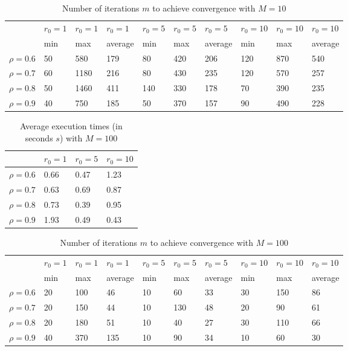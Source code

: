 \documentclass[a4paper,11pt,openright]{report}
\begin{document}
\begin{table}[H]
\centering
\addtolength{\leftskip}{-1.5cm}
\addtolength{\rightskip}{-1.5cm}
\begin{tabular}{|c|lllllllll|}
\hline
$ $ & $r_0 = 1$ & $r_0 = 1$ & $r_0 = 1$ & $r_0 = 5$ & $r_0 = 5$ & $r_0 = 5$ & $r_0 = 10$ & $r_0 = 10$ & $r_0 = 10$  \\
$ $ & min & max & average & min & max & average & min & max & average \\ 
\hline
$\rho = 0.6$ & 50 & 580 & 179 & 80 & 420 & 206 & 120 & 870 & 540 \\

$\rho = 0.7$ & 60 & 1180 & 216 & 80 & 430 & 235 & 120 & 570 & 257\\

$\rho = 0.8$ & 50 & 1460 & 411 & 140 & 330 & 178 & 70 & 390 & 235\\

$\rho = 0.9$ & 40 & 750 & 185 & 50 & 370 & 157 & 90 & 490 & 228\\
\hline
\end{tabular}
\caption{Number of iterations $m$ to achieve convergence with $M = 10$}
\end{table}
\begin{table}[H]
\centering
\addtolength{\leftskip}{-1.5cm}
\addtolength{\rightskip}{-1.5cm}
\begin{tabular}{|c|lll|}
\hline
$ $ & $r_0 = 1$ & $r_0 = 5$ & $r_0 = 10$ \\
\hline
$\rho = 0.6$ & 0.66 & 0.47 & 1.23 \\

$\rho = 0.7$ & 0.63 & 0.69 & 0.87 \\

$\rho = 0.8$ & 0.73 & 0.39 & 0.95 \\

$\rho = 0.9$ & 1.93 & 0.49 & 0.43 \\
\hline
\end{tabular}
\caption{Average execution
 times (in seconds $s$) with $M = 100$}
\end{table}
\begin{table}[H]
\centering
\addtolength{\leftskip}{-1.5cm}
\addtolength{\rightskip}{-1.5cm}
\begin{tabular}{|c|lllllllll|}
\hline
$ $ & $r_0 = 1$ & $r_0 = 1$ & $r_0 = 1$ & $r_0 = 5$ & $r_0 = 5$ & $r_0 = 5$ & $r_0 = 10$ & $r_0 = 10$ & $r_0 = 10$  \\
$ $ & min & max & average & min & max & average & min & max & average \\ 
\hline
$\rho = 0.6$ & 20 & 100 & 46 & 10 & 60 & 33 & 30 & 150 & 86 \\

$\rho = 0.7$ & 20 & 150 & 44 & 10 & 130 & 48 & 20 & 90 & 61\\

$\rho = 0.8$ & 20 & 180 & 51 & 10 & 40 & 27 & 30 & 110 & 66\\

$\rho = 0.9$ & 40 & 370 & 135 & 10 & 90 & 34 & 10 & 60 & 30\\
\hline
\end{tabular}
\caption{Number of iterations $m$ to achieve convergence with $M = 100$}
\end{table}
\end{document}
